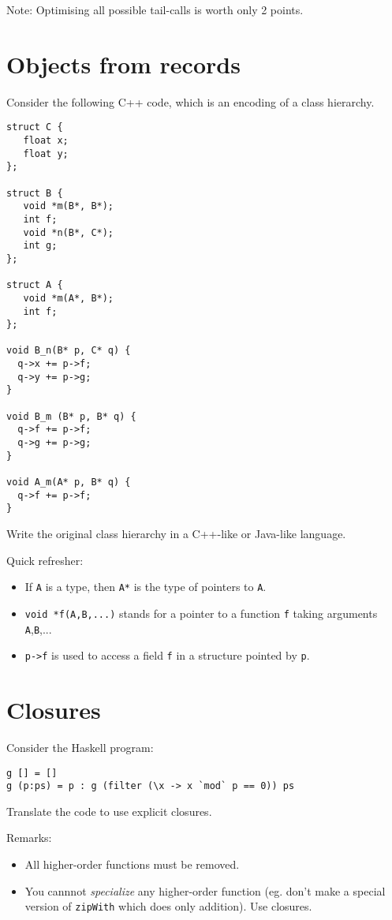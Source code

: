 \documentclass{article}
\begin{document}
Note: Optimising all possible tail-calls is worth only 2 points.

\newpage
\section{Objects from records}

Consider the following C++ code, which is an encoding of a class
hierarchy.
\begin{verbatim}
struct C {
   float x;
   float y;
};

struct B {
   void *m(B*, B*);
   int f;
   void *n(B*, C*);
   int g;
};

struct A {
   void *m(A*, B*);
   int f;
};

void B_n(B* p, C* q) {
  q->x += p->f;
  q->y += p->g;
}

void B_m (B* p, B* q) {
  q->f += p->f;
  q->g += p->g;
}

void A_m(A* p, B* q) {
  q->f += p->f;
}
\end{verbatim}

Write the original class hierarchy in a C++-like or Java-like language.

Quick refresher:
\begin{itemize}
\item If \texttt{A} is a type, then \texttt{A*} is the type of
  pointers to \texttt{A}.
\item \texttt{void *f(A,B,...)} stands for a pointer to a function
  \texttt{f} taking arguments \texttt{A},\texttt{B},...
\item \texttt{p->f} is used to access a field \texttt{f} in a
  structure pointed by \texttt{p}.
\end{itemize}
\newpage
\section{Closures}
Consider the Haskell program:

\begin{verbatim}
g [] = []
g (p:ps) = p : g (filter (\x -> x `mod` p == 0)) ps
\end{verbatim}

Translate the code to use explicit closures. 

Remarks:
\begin{itemize}
\item All higher-order functions must be removed.
\item You cannnot \emph{specialize} any higher-order function
  (eg. don't make a special version of \texttt{zipWith} which does
  only addition).  Use closures.
\end{itemize}
\end{document}
